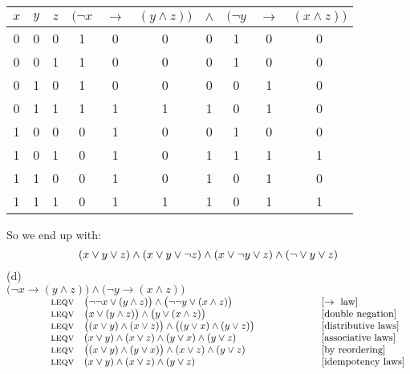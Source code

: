 \documentclass[12pt]{article}
\newcommand{\bigbracket}[1]{\big(#1\big)}
\begin{document}
\begin{center} \begin{tabular}{|c|c|c|| ccccccc|}
    \hline
    $x$ & $y$ & $z$ &$\big(\neg x$&$\to$&$ (y \wedge z) \big)$&$ \wedge $&$\big(\neg y$&$ \to $&$ (x \wedge z)\big)$\\ 
    \hline \hline 
    \rowcolor{epicOrange}0&0&0&  1&0&0&0&1&0&0 \\   
    \rowcolor{epicOrange}0&0&1&  1&0&0&0&1&0&0 \\
    \rowcolor{epicOrange}0&1&0&  1&0&0&0&0&1&0 \\  
    0&1&1&  1&1&1&1&0&1&0 \\ 
    \hline 
    \rowcolor{epicOrange}1&0&0&  0&1&0&0&1&0&0 \\  
    1&0&1&  0&1&0&1&1&1&1 \\  
    1&1&0&  0&1&0&1&0&1&0 \\  
    1&1&1&  0&1&1&1&0&1&1 \\  
    \hline 
\end{tabular} \end{center}
So we end up with:
\[(x \vee  y \vee  z) \wedge (  x \vee  y \vee \neg z) \wedge ( x \vee \neg y \vee  z) \wedge (\neg  \vee  y \vee  z)\\
\]
\newpage (d)\\
$\bigbracket{\neg x \to (y \wedge z)} \wedge \bigbracket{\neg y \to (x \wedge z)} $\\
{$\begin{array}{rc>{\displaystyle}ll}
        \hspace*{10mm}& \text{\textsc{leqv}} & \bigbracket{\neg\neg x \vee (y \wedge z)} \wedge \bigbracket{\neg \neg  y \vee (x \wedge z)}   & [\to \text{ law}] \\
        & \text{\textsc{leqv}} & \bigbracket{ x \vee (y \wedge z)} \wedge \bigbracket{ y \vee (x \wedge z)}  & [\text{double negation}] \\
        & \text{\textsc{leqv}} & \bigbracket{ (x \vee y) \wedge (x \vee z)} \wedge \bigbracket{ (y \vee x) \wedge (y \vee z)}  \hspace*{20mm} & [\text{distributive laws}] \\
        & \text{\textsc{leqv}} &  (x \vee y) \wedge (x \vee z) \wedge  (y \vee x) \wedge (y \vee z)   & [\text{associative laws}] \\
        & \text{\textsc{leqv}} &  \big((x \vee y) \wedge  (y \vee x)\big) \wedge (x \vee z)  \wedge (y \vee z)   & [\text{by reordering}] \\
        & \text{\textsc{leqv}} &  (x \vee y)  \wedge (x \vee z)  \wedge (y \vee z)   & [\text{idempotency laws}] \\
\end{array}$}
\end{document}
